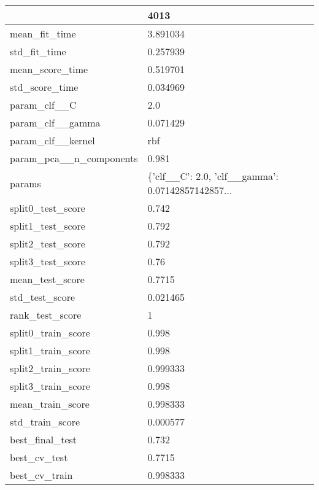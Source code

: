 \begin{tabular}{ll}
\toprule
{} &                                               4013 \\
\midrule
mean\_fit\_time           &                                           3.891034 \\
std\_fit\_time            &                                           0.257939 \\
mean\_score\_time         &                                           0.519701 \\
std\_score\_time          &                                           0.034969 \\
param\_clf\_\_C            &                                                2.0 \\
param\_clf\_\_gamma        &                                           0.071429 \\
param\_clf\_\_kernel       &                                                rbf \\
param\_pca\_\_n\_components &                                              0.981 \\
params                  &  \{'clf\_\_C': 2.0, 'clf\_\_gamma': 0.07142857142857... \\
split0\_test\_score       &                                              0.742 \\
split1\_test\_score       &                                              0.792 \\
split2\_test\_score       &                                              0.792 \\
split3\_test\_score       &                                               0.76 \\
mean\_test\_score         &                                             0.7715 \\
std\_test\_score          &                                           0.021465 \\
rank\_test\_score         &                                                  1 \\
split0\_train\_score      &                                              0.998 \\
split1\_train\_score      &                                              0.998 \\
split2\_train\_score      &                                           0.999333 \\
split3\_train\_score      &                                              0.998 \\
mean\_train\_score        &                                           0.998333 \\
std\_train\_score         &                                           0.000577 \\
best\_final\_test         &                                              0.732 \\
best\_cv\_test            &                                             0.7715 \\
best\_cv\_train           &                                           0.998333 \\
\bottomrule
\end{tabular}
